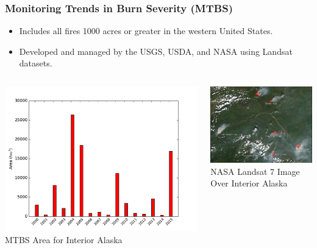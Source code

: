 \documentclass{beamer}
\begin{document}
\begin{frame}
  \frametitle{Monitoring Trends in Burn Severity (MTBS)}
\begin{itemize}
 \item Includes all fires 1000 acres or greater in the western United States. 
 \item Developed and managed by the USGS, USDA, and NASA using Landsat datasets.
\end{itemize}


\begin{columns}[T]
    \begin{column}{.5\textwidth}

  \includegraphics[width=1.0\textwidth]{figs/mtbs_fires}
\\  
MTBS Area for Interior Alaska
\end{column}
    \begin{column}{.5\textwidth}

     \centering
\includegraphics[width=1.0\textwidth]{figs/Bonanza_Creek_AMOA2004172.jpg}
\\

NASA Landsat 7 Image Over Interior Alaska

    \end{column}
  \end{columns}
  
\end{frame}  
\end{document}
